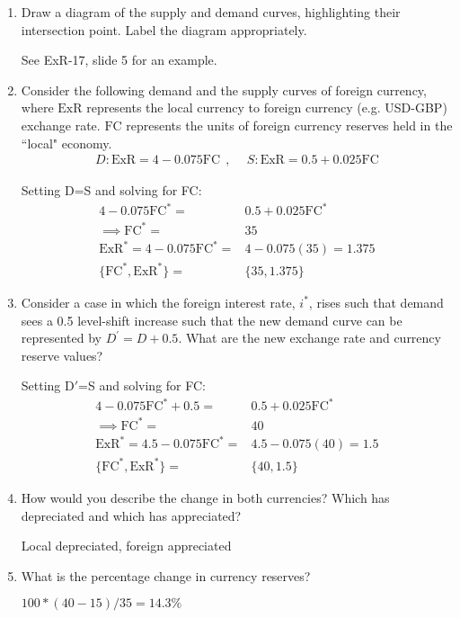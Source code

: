 \documentclass[12pt]{article}
\begin{document}
\begin{enumerate}[1)]
	\item Draw a diagram of the supply and demand curves, highlighting their intersection point. Label the diagram appropriately. 
	
	\vspace{0.2in}
	See ExR-17, slide 5 for an example.
	\vspace{0.2in}
	
	\item Consider the following demand and the supply curves of foreign currency, where $\text{ExR}$ represents the local currency to foreign currency (e.g. USD-GBP) exchange rate.
	$\text{FC}$ represents the units of foreign currency reserves held in the ``local" economy. 
	\begin{align*}
	D: \text{ExR} =  4 - 0.075 \text{FC} \ \ , & \ \ S: \text{ExR} =  0.5 + 0.025 \text{FC}
	\end{align*}
	
	\vspace{0.2in}
	Setting D=S and solving for FC:
	\begin{align*}
	 4 - 0.075 \text{FC}^* = & 0.5 + 0.025 \text{FC}^* \\
	 \implies \text{FC}^* = &35 \\
	 \text{ExR}^* =  4 - 0.075 \text{FC}^* =& 4 - 0.075 (35) = 1.375 \\
	\{\text{FC}^*,\text{ExR}^*\}=&\{35,1.375\}
	\end{align*}
	
	\item Consider a case in which the foreign interest rate, $i^*$, rises such that demand sees a 0.5 level-shift increase such that the new demand curve can be represented by $D^{'} = D + 0.5$.
	What are the new exchange rate and currency reserve values?
	
		Setting D$'$=S and solving for FC:
	\begin{align*}
	4 - 0.075 \text{FC}^* + 0.5 = & 0.5 + 0.025 \text{FC}^* \\
	\implies \text{FC}^* = &40 \\
	\text{ExR}^* =  4.5 - 0.075 \text{FC}^* =& 4.5 - 0.075 (40) = 1.5 \\
	\{\text{FC}^*,\text{ExR}^*\}=&\{40,1.5\}
	\end{align*}
	
	\item How would you describe the change in both currencies? Which has depreciated and which has appreciated?
	
	\vspace{0.2in}
	Local depreciated, foreign appreciated
	\vspace{0.2in}
	
	\item What is the percentage change in currency reserves?
	
	\vspace{0.2in}
	$100*(40-15)/35 = 14.3\%$
	\vspace{0.2in}
	
\end{enumerate}
\end{document}
